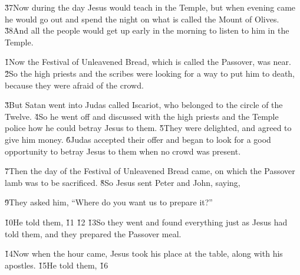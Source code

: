 \v{37}Now during the day Jesus would teach in the Temple, but when evening came he would go out and spend the night on what is called the Mount of Olives. \v{38}And all the people would get up early in the morning to listen to him in the Temple.

\v{1}Now the Festival of Unleavened Bread, which is called the Passover, was near. \v{2}So the high priests and the scribes were looking for a way to put him to death, because they were afraid of the crowd.

\v{3}But Satan went into Judas called Iscariot, who belonged to the circle of the Twelve. \v{4}So he went off and discussed with the high priests and the Temple police how he could betray Jesus to them. \v{5}They were delighted, and agreed to give him money. \v{6}Judas accepted their offer and began to look for a good opportunity to betray Jesus to them when no crowd was present.

\v{7}Then the day of the Festival of Unleavened Bread came, on which the Passover lamb was to be sacrificed. \v{8}So Jesus sent Peter and John, saying, 

\v{9}They asked him, ``Where do you want us to prepare it?''

\v{10}He told them,  \v{11} \v{12} \v{13}So they went and found everything just as Jesus had told them, and they prepared the Passover meal.

\v{14}Now when the hour came, Jesus took his place at the table, along with his apostles. \v{15}He told them,  \v{16}

